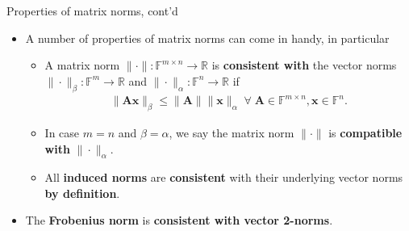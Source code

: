 \documentclass[t,usepdftitle=false]{beamer}
\begin{document}
\begin{frame}{Properties of matrix norms, cont'd}
\begin{itemize} 
\item A number of properties of matrix norms can come in handy, in particular
\begin{definition}
\begin{itemize}
\item[-] A matrix norm $\|\cdot\|:\mathbb{F}^{m\times n}\rightarrow \mathbb{R}$ is \textbf{consistent with} the vector norms $\|\cdot\|_\beta:\mathbb{F}^{m}\rightarrow \mathbb{R}$ and $\|\cdot\|_\alpha:\mathbb{F}^{n}\rightarrow \mathbb{R}$ if
\begin{align*}
\|\mathbf{A}\mathbf{x}\|_\beta\leq\|\mathbf{A}\|\|\mathbf{x}\|_\alpha\;\forall\;\mathbf{A}\in\mathbb{F}^{m\times n},\mathbf{x}\in\mathbb{F}^n.
\end{align*}
\item[-] In case $m=n$ and $\beta=\alpha$, we say the matrix norm $\|\cdot\|$ is \textbf{compatible with} $\|\cdot\|_\alpha$.
\item[-] All \textbf{induced norms} are \textbf{consistent} with their underlying vector norms \textbf{by definition}.
\end{itemize}
\end{definition}
\item The \textbf{Frobenius norm} is \textbf{consistent with vector 2-norms}.
\end{itemize}
\end{frame}
\end{document}
